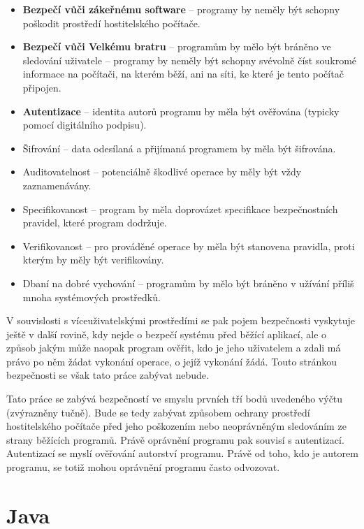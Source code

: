 \begin{itemize}
  \item {\bf Bezpečí vůči zákeřnému software} -- programy by neměly být schopny poškodit prostředí hostitelského počítače.
  \item {\bf Bezpečí vůči Velkému bratru} -- programům by mělo být bráněno ve sledování uživatele -- programy by neměly být schopny svévolně číst soukromé informace na počítači, na kterém běží, ani na síti, ke které je tento počítač připojen.
  \item {\bf Autentizace} -- identita autorů programu by měla být ověřována (typicky pomocí digitálního podpisu).
  \item Šifrování -- data odesílaná a přijímaná programem by měla být šifrována.
  \item Auditovatelnost -- potenciálně škodlivé operace by měly být vždy zaznamenávány.
  \item Specifikovanost -- program by měla doprovázet specifikace bezpečnostních pravidel, které program dodržuje.
  \item Verifikovanost -- pro prováděné operace by měla být stanovena pravidla, proti kterým by měly být verifikovány.
  \item Dbaní na dobré vychování -- programům by mělo být bráněno v užívání příliš mnoha systémových prostředků.
\end{itemize}

V souvislosti s víceuživatelskými prostředími se pak pojem bezpečnosti vyskytuje ještě v další rovině, kdy nejde o bezpečí systému před běžící aplikací, ale o způsob jakým může naopak program ověřit, kdo je jeho uživatelem a zdali má právo po něm žádat vykonání operace, o jejíž vykonání žádá. Touto stránkou bezpečnosti se však tato práce zabývat nebude.

Tato práce se zabývá bezpečností ve smyslu prvních tří bodů uvedeného výčtu (zvýrazněny tučně). Bude se tedy zabývat způsobem ochrany prostředí hostitelského počítače před jeho poškozením nebo neoprávněným sledováním ze strany běžících programů. Právě oprávnění programu pak souvisí s autentizací. Autentizací se myslí ověřování autorství programu. Právě od toho, kdo je autorem programu, se totiž mohou oprávnění programu často odvozovat.

\section{Java}

